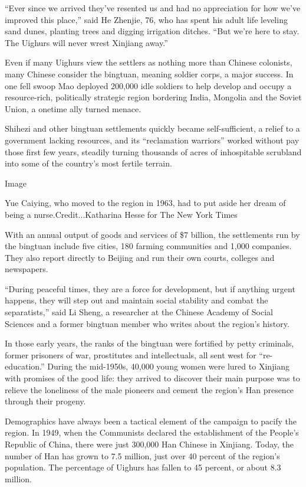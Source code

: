 ``Ever since we arrived they've resented us and had no appreciation for
how we've improved this place,'' said He Zhenjie, 76, who has spent his
adult life leveling sand dunes, planting trees and digging irrigation
ditches. ``But we're here to stay. The Uighurs will never wrest Xinjiang
away.''

Even if many Uighurs view the settlers as nothing more than Chinese
colonists, many Chinese consider the bingtuan, meaning soldier corps, a
major success. In one fell swoop Mao deployed 200,000 idle soldiers to
help develop and occupy a resource-rich, politically strategic region
bordering India, Mongolia and the Soviet Union, a onetime ally turned
menace.

Shihezi and other bingtuan settlements quickly became self-sufficient, a
relief to a government lacking resources, and its ``reclamation
warriors'' worked without pay those first few years, steadily turning
thousands of acres of inhospitable scrubland into some of the country's
most fertile terrain.

Image

Yue Caiying, who moved to the region in 1963, had to put aside her dream
of being a nurse.Credit...Katharina Hesse for The New York Times

With an annual output of goods and services of \$7 billion, the
settlements run by the bingtuan include five cities, 180 farming
communities and 1,000 companies. They also report directly to Beijing
and run their own courts, colleges and newspapers.

``During peaceful times, they are a force for development, but if
anything urgent happens, they will step out and maintain social
stability and combat the separatists,'' said Li Sheng, a researcher at
the Chinese Academy of Social Sciences and a former bingtuan member who
writes about the region's history.

In those early years, the ranks of the bingtuan were fortified by petty
criminals, former prisoners of war, prostitutes and intellectuals, all
sent west for ``re-education.'' During the mid-1950s, 40,000 young women
were lured to Xinjiang with promises of the good life: they arrived to
discover their main purpose was to relieve the loneliness of the male
pioneers and cement the region's Han presence through their progeny.

Demographics have always been a tactical element of the campaign to
pacify the region. In 1949, when the Communists declared the
establishment of the People's Republic of China, there were just 300,000
Han Chinese in Xinjiang. Today, the number of Han has grown to 7.5
million, just over 40 percent of the region's population. The percentage
of Uighurs has fallen to 45 percent, or about 8.3 million.

